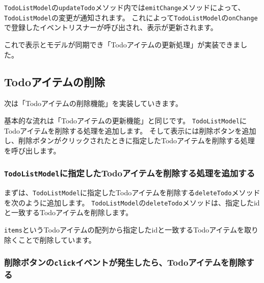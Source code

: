 

\texttt{TodoListModel}の\texttt{updateTodo}メソッド内では\texttt{emitChange}メソッドによって、\texttt{TodoListModel}の変更が通知されます。
これによって\texttt{TodoListModel}の\texttt{onChange}で登録したイベントリスナーが呼び出され、表示が更新されます。

これで表示とモデルが同期でき「Todoアイテムの更新処理」が実装できました。

\hypertarget{delete}{%
\subsection{Todoアイテムの削除}\label{delete}}

次は「Todoアイテムの削除機能」を実装していきます。

基本的な流れは「Todoアイテムの更新機能」と同じです。
\texttt{TodoListModel}にTodoアイテムを削除する処理を追加します。
そして表示には削除ボタンを追加し、削除ボタンがクリックされたときに指定したTodoアイテムを削除する処理を呼び出します。

\hypertarget{TodoListModel-deleteTodo}{%
\subsubsection{\texorpdfstring{\texttt{TodoListModel}に指定したTodoアイテムを削除する処理を追加する}{TodoListModelに指定したTodoアイテムを削除する処理を追加する}}\label{TodoListModel-deleteTodo}}

まずは、\texttt{TodoListModel}に指定したTodoアイテムを削除する\texttt{deleteTodo}メソッドを次のように追加します。
\texttt{TodoListModel}の\texttt{deleteTodo}メソッドは、指定したidと一致するTodoアイテムを削除します。

\texttt{items}というTodoアイテムの配列から指定したidと一致するTodoアイテムを取り除くことで削除しています。



\hypertarget{onChange-update-model}{%
\subsubsection{\texorpdfstring{削除ボタンの\texttt{click}イベントが発生したら、Todoアイテムを削除する}{削除ボタンのclickイベントが発生したら、Todoアイテムを削除する}}\label{onChange-update-model}}

